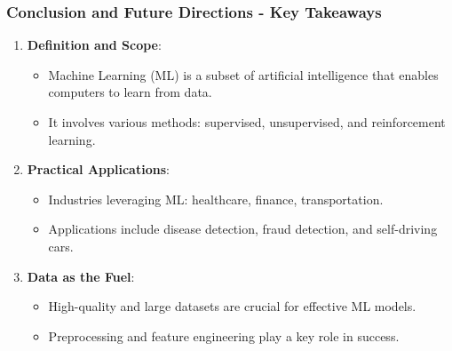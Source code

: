 \documentclass[aspectratio=169]{beamer}
\begin{document}
\begin{frame}[fragile]
    \frametitle{Conclusion and Future Directions - Key Takeaways}
    \begin{enumerate}
        \item \textbf{Definition and Scope}:
            \begin{itemize}
                \item Machine Learning (ML) is a subset of artificial intelligence that enables computers to learn from data.
                \item It involves various methods: supervised, unsupervised, and reinforcement learning.
            \end{itemize}
        \item \textbf{Practical Applications}:
            \begin{itemize}
                \item Industries leveraging ML: healthcare, finance, transportation.
                \item Applications include disease detection, fraud detection, and self-driving cars.
            \end{itemize}
        \item \textbf{Data as the Fuel}:
            \begin{itemize}
                \item High-quality and large datasets are crucial for effective ML models.
                \item Preprocessing and feature engineering play a key role in success.
            \end{itemize}
    \end{enumerate}
\end{frame}
\end{document}
